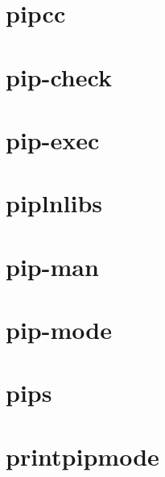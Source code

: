 \section{pipcc}

\section{pip-check}

\section{pip-exec}

\section{piplnlibs}

\section{pip-man}

\section{pip-mode}

\section{pips}

\section{printpipmode}

